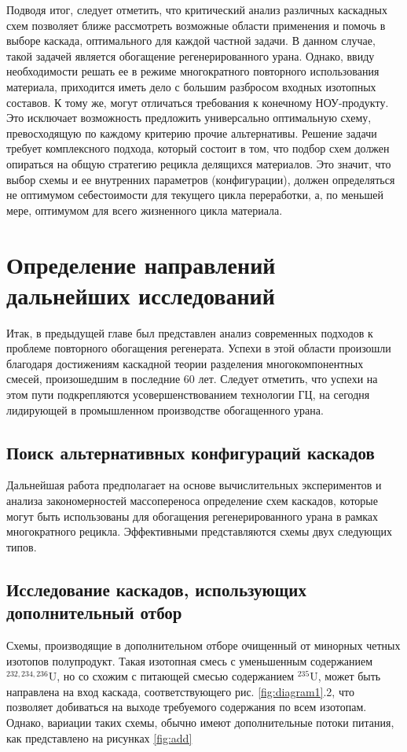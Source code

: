 Подводя итог, следует отметить, что критический анализ различных каскадных схем позволяет ближе рассмотреть возможные области применения и помочь в выборе каскада, оптимального для каждой частной задачи.
В данном случае, такой задачей является обогащение регенерированного урана.
Однако, ввиду необходимости решать ее в режиме многократного повторного использования материала, приходится иметь дело с большим разбросом входных изотопных составов.
К тому же, могут отличаться требования к конечному НОУ-продукту.
Это исключает возможность предложить универсально оптимальную схему, превосходящую по каждому критерию прочие альтернативы.
Решение задачи требует комплексного подхода, который состоит в том, что подбор схем должен опираться на общую стратегию рецикла делящихся материалов.
Это значит, что выбор схемы и ее внутренних параметров (конфигурации), должен определяться не оптимумом себестоимости для текущего цикла переработки, а, по меньшей мере, оптимумом для всего жизненного цикла материала.

\section{Определение направлений дальнейших исследований}

Итак, в предыдущей главе был представлен анализ современных подходов к проблеме повторного обогащения регенерата.
Успехи в этой области произошли благодаря достижениям каскадной теории разделения многокомпонентных смесей, произошедшим в последние 60 лет.
Следует отметить, что успехи на этом пути подкрепляются усовершенствованием технологии ГЦ, на сегодня лидирующей в промышленном производстве обогащенного урана.

\subsection{Поиск альтернативных конфигураций каскадов}
Дальнейшая работа предполагает на основе вычислительных экспериментов и анализа закономерностей массопереноса определение схем каскадов, которые могут быть использованы для обогащения регенерированного урана в рамках многократного рецикла.
Эффективными представляются схемы двух следующих типов.

\subsection{Исследование каскадов, использующих дополнительный отбор}
Схемы, производящие в дополнительном отборе очищенный от минорных четных изотопов полупродукт. Такая изотопная смесь с уменьшенным содержанием $^{232,234,236}$U, но со схожим с питающей смесью содержанием $^{235}$U, может быть направлена на вход каскада, соответствующего рис. \ref{fig:diagram1}.2, что позволяет добиваться на выходе требуемого содержания по всем изотопам. Однако, вариации таких схемы, обычно имеют дополнительные потоки питания, как представлено на рисунках \ref{fig:add}

